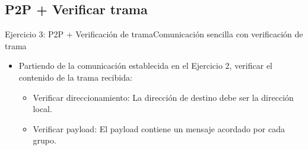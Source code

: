 \documentclass[aspectratio=169]{beamer}
\begin{document}
\subsection[P2P+Verificar]{P2P + Verificar trama}
\begin{frame}[t]{Ejercicio 3: P2P + Verificación de trama}{Comunicación sencilla con verificación de trama}
    \begin{itemize}
        \item Partiendo de la comunicación establecida en el Ejercicio 2, verificar el contenido de la trama recibida:
        \vspace{5px}
            \begin{itemize}
            \item Verificar direccionamiento: La dirección de destino debe ser la dirección local.
            \vspace{5px}
            \item Verificar payload: El payload contiene un mensaje acordado por cada grupo.
            \vspace{5px}
            \end{itemize}
        \vspace{5px}
    \end{itemize}   
\end{frame}

\end{document}
